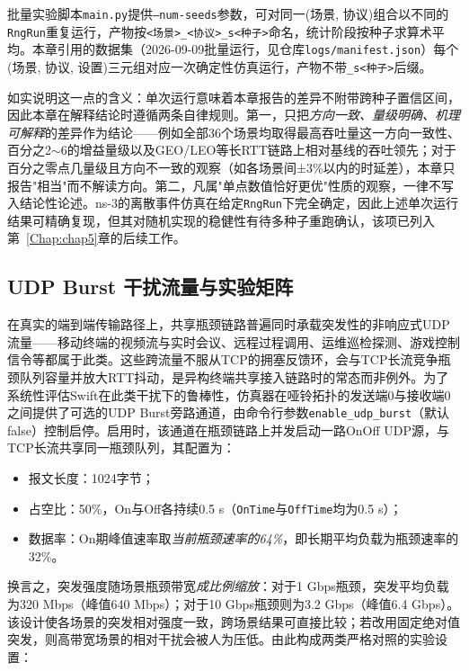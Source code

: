 批量实验脚本\texttt{main.py}提供\texttt{--num-seeds}参数，可对同一(场景, 协议)组合以不同的\texttt{RngRun}重复运行，产物按\texttt{<场景>\_<协议>\_s<种子>}命名，统计阶段按种子求算术平均。本章引用的数据集（2026-09-09批量运行，见仓库\texttt{logs/manifest.json}）每个(场景, 协议, 设置)三元组对应一次确定性仿真运行，产物不带\texttt{\_s<种子>}后缀。

如实说明这一点的含义：单次运行意味着本章报告的差异不附带跨种子置信区间，因此本章在解释结论时遵循两条自律规则。第一，只把\emph{方向一致、量级明确、机理可解释}的差异作为结论——例如全部36个场景均取得最高吞吐量这一方向一致性、百分之2$\sim$6的增益量级以及GEO/LEO等长RTT链路上相对基线的吞吐领先；对于百分之零点几量级且方向不一致的观察（如各场景间±3\%以内的时延差），本章只报告"相当"而不解读方向。第二，凡属"单点数值恰好更优"性质的观察，一律不写入结论性论述。ns-3的离散事件仿真在给定\texttt{RngRun}下完全确定，因此上述单次运行结果可精确复现，但其对随机实现的稳健性有待多种子重跑确认，该项已列入第~\ref{Chap:chap5}章的后续工作。

\subsection{UDP Burst 干扰流量与实验矩阵}
\label{sec:udp-burst-matrix}

在真实的端到端传输路径上，共享瓶颈链路普遍同时承载突发性的非响应式UDP流量——移动终端的视频流与实时会议、远程过程调用、运维巡检探测、游戏控制信令等都属于此类。这些跨流量不服从TCP的拥塞反馈环，会与TCP长流竞争瓶颈队列容量并放大RTT抖动，是异构终端共享接入链路时的常态而非例外。为了系统性评估Swift在此类干扰下的鲁棒性，仿真器在哑铃拓扑的发送端0与接收端0之间提供了可选的UDP Burst旁路通道，由命令行参数\texttt{enable\_udp\_burst}（默认false）控制启停。启用时，该通道在瓶颈链路上并发启动一路OnOff UDP源，与TCP长流共享同一瓶颈队列，其配置为：

\begin{itemize}
    \item 报文长度：1024字节；
    \item 占空比：50\%，On与Off各持续0.5 s（\texttt{OnTime}与\texttt{OffTime}均为0.5 s）；
    \item 数据率：On期峰值速率取\emph{当前瓶颈速率的64\%}，即长期平均负载为瓶颈速率的32\%。
\end{itemize}

换言之，突发强度随场景瓶颈带宽\emph{成比例缩放}：对于1 Gbps瓶颈，突发平均负载为320 Mbps（峰值640 Mbps）；对于10 Gbps瓶颈则为3.2 Gbps（峰值6.4 Gbps）。该设计使各场景的突发相对强度一致，跨场景结果可直接比较；若改用固定绝对值突发，则高带宽场景的相对干扰会被人为压低。由此构成两类严格对照的实验设置：


